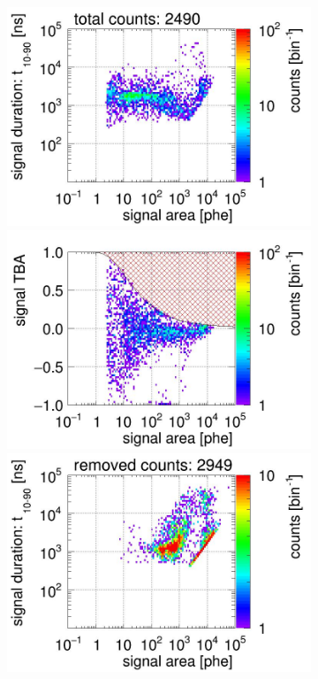 \begin{landscape}
	\begin{figure}[!p]\ContinuedFloat
		\centering
		\begin{subfigure}[t]{0.33\textwidth} %
			\centering
			\includegraphics[width=\figurewidth,clip,trim={0 98 0 0}]{Figures/GasTest/CutsValid/res64767/pdpa07Vecfig64767.jpg}
			\includegraphics[width=\figurewidth,clip,trim={0 98 0 40}]{Figures/GasTest/CutsValid/res64767/tbapa07Vecfig64767.jpg}
			\includegraphics[width=\figurewidth,clip,trim={0 98 0 10}]{Figures/GasTest/CutsValid/res64767/pdpaX07Vecfig64767.jpg}

\end{subfigure}
\end{figure}
\end{landscape}

